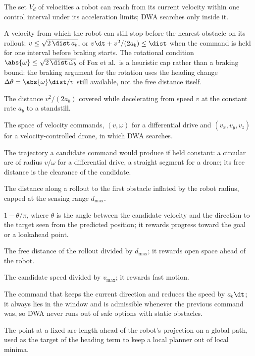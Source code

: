 \item[Dynamic window] The set $V_d$ of velocities a robot can reach from its current velocity within one control interval under its acceleration limits; DWA searches only inside it.
\item[Admissible velocity] A velocity from which the robot can still stop before the nearest obstacle on its rollout: $v\le\sqrt{2\,\dist\,a_b}$, or $v\dt+v^2/(2a_b)\le\dist$ when the command is held for one interval before braking starts. The rotational condition $\abs{\omega}\le\sqrt{2\,\dist\,\dot\omega_b}$ of Fox et al.\ is a heuristic cap rather than a braking bound: the braking argument for the rotation uses the heading change $\Delta\theta=\abs{\omega}\dist/v$ still available, not the free distance itself.
\item[Braking distance] The distance $v^2/(2a_b)$ covered while decelerating from speed $v$ at the constant rate $a_b$ to a standstill.
\item[Velocity space] The space of velocity commands, $(v,\omega)$ for a differential drive and $(v_x,v_y,v_z)$ for a velocity-controlled drone, in which DWA searches.
\item[Rollout] The trajectory a candidate command would produce if held constant: a circular arc of radius $v/\omega$ for a differential drive, a straight segment for a drone; its free distance is the clearance of the candidate.
\item[Free distance] The distance along a rollout to the first obstacle inflated by the robot radius, capped at the sensing range $d_{\max}$.
\item[Heading term] $1-\theta/\pi$, where $\theta$ is the angle between the candidate velocity and the direction to the target seen from the predicted position; it rewards progress toward the goal or a lookahead point.
\item[Clearance term] The free distance of the rollout divided by $d_{\max}$; it rewards open space ahead of the robot.
\item[Velocity term] The candidate speed divided by $v_{\max}$; it rewards fast motion.
\item[Braking candidate] The command that keeps the current direction and reduces the speed by $a_b\dt$; it always lies in the window and is admissible whenever the previous command was, so DWA never runs out of safe options with static obstacles.
\item[Lookahead point] The point at a fixed arc length ahead of the robot's projection on a global path, used as the target of the heading term to keep a local planner out of local minima.
